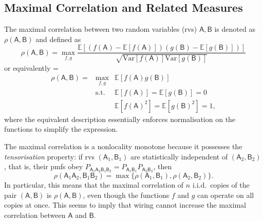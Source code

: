 \documentclass[10pt, a4paper]{article}
\numberwithin{equation}{section} %
\theoremstyle{definition}
\theoremstyle{plain}
\newenvironment{Array}[1] %
{\def\arraystretch{1.75}\everymath={\displaystyle}\begin{equation}\begin{array}{#1}}
{\end{array}\end{equation}}
\newcommand{\?}{\mathrel{?}} %
\newcommand{\E}{\mathbb{E}} %
\newcommand{\Var}{\mathrm{Var}} %
\newcommand{\crv}[1]{\mathsf{#1}}
\begin{document}
    \subsection{Maximal Correlation and Related Measures}\label{sec:nlmono_maxcorr}

    The maximal correlation between two random variables (rvs) \(\crv{A},\crv{B}\) is denoted as \(\rho(\crv{A},\crv{B})\) and defined as~\cite{NLMonotones}
    \begin{equation}
      \rho(\crv{A},\crv{B}) = \max_{f,g} \frac{\E[(f(\crv{A})-\E[f(\crv{A})])(g(\crv{B})-\E[g(\crv{B})])]}{\sqrt{\Var[f(\crv{A})]\Var[g(\crv{B})]}}
    \end{equation}
    or equivalently
    \begin{Array}{rcl}
      \rho(\crv{A},\crv{B}) = & \max_{f,g}  & \E[f(\crv{A})g(\crv{B})] \\
                  & \text{s.t.} & \E[f(\crv{A})] = \E[g(\crv{B})] = 0 \\
                  &             & \E[f(\crv{A})^2] = \E[g(\crv{B})^2] = 1,
    \end{Array}
    where the equivalent description essentially enforces normalisation on the functions to simplify the expression.

    The maximal correlation is a nonlocality monotone because it possesses the \emph{tensorisation} property: if rvs \((\crv{A}_1, \crv{B}_1)\) are statistically independent of \((\crv{A}_2,\crv{B}_2)\), that is, their pmfs obey \(P_{\crv{A}_1\crv{A}_2\crv{B}_1\crv{B}_2} = P_{\crv{A}_1\crv{B}_1}P_{\crv{A}_2\crv{B}_2}\), then
    \begin{equation}
      \rho(\crv{A}_1\crv{A}_2,\crv{B}_1\crv{B}_2) = \max\{ \rho(\crv{A}_1,\crv{B}_1), \rho(\crv{A}_2,\crv{B}_2) \}.
    \end{equation}
    In particular, this means that the maximal correlation of \(n\) i.i.d.\ copies of the pair \((\crv{A},\crv{B})\) is \(\rho(\crv{A},\crv{B})\), even though the functions \(f\) and \(g\) can operate on all copies at once. This seems to imply that wiring cannot increase the maximal correlation between \(\crv{A}\) and \(\crv{B}\).
\end{document}
